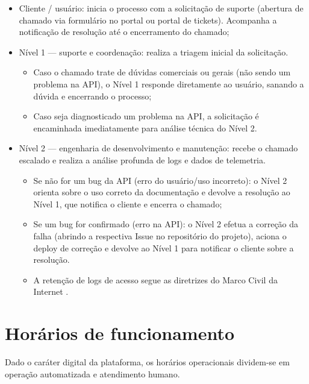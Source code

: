 \documentclass[
  12pt,
  openright,
  oneside,
  a4paper,
  brazilian
]{abntex2}
\begin{document}
\begin{itemize}
    \item{Cliente / usuário:} inicia o processo com a solicitação de suporte (abertura de chamado via formulário no portal ou portal de tickets). Acompanha a notificação de resolução até o encerramento do chamado;
    \item{Nível 1 — suporte e coordenação:} realiza a triagem inicial da solicitação.
    \begin{itemize}
        \item Caso o chamado trate de dúvidas comerciais ou gerais (não sendo um problema na API), o Nível 1 responde diretamente ao usuário, sanando a dúvida e encerrando o processo;
        \item Caso seja diagnosticado um problema na API, a solicitação é encaminhada imediatamente para análise técnica do Nível 2.
    \end{itemize}
    \item{Nível 2 — engenharia de desenvolvimento e manutenção:} recebe o chamado escalado e realiza a análise profunda de logs e dados de telemetria.
    \begin{itemize}
        \item Se não for um bug da API (erro do usuário/uso incorreto): o Nível 2 orienta sobre o uso correto da documentação e devolve a resolução ao Nível 1, que notifica o cliente e encerra o chamado;
        \item Se um bug for confirmado (erro na API): o Nível 2 efetua a correção da falha (abrindo a respectiva Issue no repositório do projeto), aciona o deploy de correção e devolve ao Nível 1 para notificar o cliente sobre a resolução.
        \item A retenção de logs de acesso segue as diretrizes do Marco Civil da Internet \cite{brasil2014marcocivil}.
    \end{itemize}
\end{itemize}

\section{Horários de funcionamento}
\label{sec:horario_funcionamento}

Dado o caráter digital da plataforma, os horários operacionais dividem-se em operação automatizada e atendimento humano.
\end{document}
